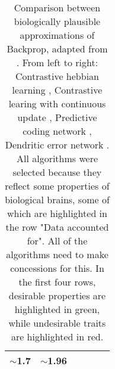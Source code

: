 \begin{table}[h]
{\begin{tabular}{|ll|ll|ll|}
               \multicolumn{1}{l|}{\cellcolor[HTML]{D9D9D9}$\sim$1.7}
                                                                                                               & $\sim$1.96     \\
               \hline
    \end{tabular}
  }\caption[Comparison between biologically plausible approximations of Backprop]{Comparison between biologically
    plausible approximations of Backprop, adapted from \citep{whittington2019theories}. From left to right: Contrastive
    hebbian learning \citep{OReilly1996}, Contrastive learing with continuous update \citep{Bengio2017}, Predictive
    coding network \citep{Whittington2017}, Dendritic error network \citep{sacramento2018dendritic}. All algorithms were
    selected because they reflect some properties of biological brains, some of which are highlighted in the row "Data
    accounted for". All of the algorithms need to make concessions for this. In the first four rows, desirable
    properties are highlighted in green, while undesirable traits are highlighted in red.}\label{tab-wb-models}

\end{table}


